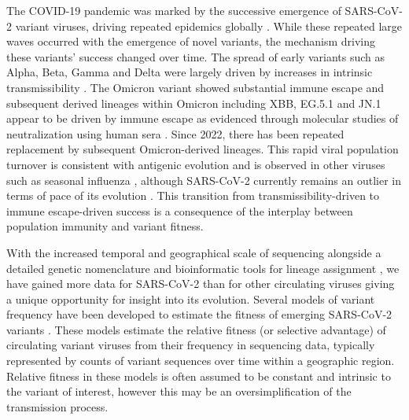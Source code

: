 \documentclass[11pt,oneside,letterpaper]{article}
\begin{document}
The COVID-19 pandemic was marked by the successive emergence of SARS-CoV-2 variant viruses, driving repeated epidemics globally \cite{tegally2021detection, Volz2021}.
While these repeated large waves occurred with the emergence of novel variants, the mechanism driving these variants' success changed over time.
The spread of early variants such as Alpha, Beta, Gamma and Delta were largely driven by increases in intrinsic transmissibility \cite{carabelli2023sars}.
The Omicron variant showed substantial immune escape \cite{carabelli2023sars} and subsequent derived lineages within Omicron including XBB, EG.5.1 and JN.1 appear to be driven by immune escape as evidenced through molecular studies of neutralization using human sera \cite{Cao2021, Cao2022, Bekliz2024, Jian2023}.
Since 2022, there has been repeated replacement by subsequent Omicron-derived lineages.
This rapid viral population turnover is consistent with antigenic evolution and is observed in other viruses such as seasonal influenza \cite{bedford2014integrating}, although SARS-CoV-2 currently remains an outlier in terms of pace of its evolution \cite{kistler2023atlas}.
This transition from transmissibility-driven to immune escape-driven success is a consequence of the interplay between population immunity and variant fitness.


With the increased temporal and geographical scale of sequencing alongside a detailed genetic nomenclature \cite{rambaut2020dynamic} and bioinformatic tools for lineage assignment \cite{turakhia2021ultrafast, aksamentov2021nextclade}, we have gained more data for SARS-CoV-2 than for other circulating viruses giving a unique opportunity for insight into its evolution.
Several models of variant frequency have been developed to estimate the fitness of emerging SARS-CoV-2 variants \cite{Annavajhala2021, Piantham2022, figgins2022sars, susswein2023leveraging, Lefrancq2023, abousamra2024fitness}.
These models estimate the relative fitness (or selective advantage) of circulating variant viruses from their frequency in sequencing data, typically represented by counts of variant sequences over time within a geographic region.
Relative fitness in these models is often assumed to be constant and intrinsic to the variant of interest, however this may be an oversimplification of the transmission process.
\end{document}
